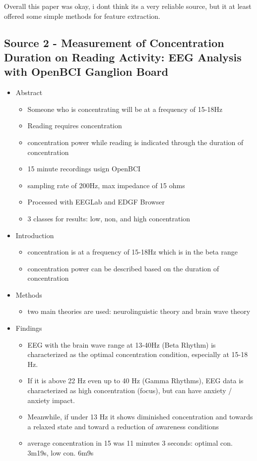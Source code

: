 \documentclass[a4paper]{article}
\begin{document}
Overall this paper was okay, i dont think its a very reliable source, but it at least offered some simple methods for feature extraction.

\subsection*{Source 2 - Measurement of Concentration Duration on Reading Activity: EEG Analysis with OpenBCI Ganglion Board}

\begin{itemize}
    \item Abstract
          \begin{itemize}
              \item Someone who is concentrating will be at a frequency of 15-18Hz
              \item Reading requires concentration
              \item concentration power while reading is indicated through the duration of concentration
              \item 15 minute recordings usign OpenBCI
              \item sampling rate of 200Hz, max impedance of 15 ohms
              \item Processed with EEGLab and EDGF Browser
              \item 3 classes for results: low, non, and high concentration
          \end{itemize}
    \item Introduction
          \begin{itemize}
              \item concentration is at a frequency of 15-18Hz which is in the beta range
              \item concentration power can be described based on the duration of concentration
          \end{itemize}
    \item Methods
          \begin{itemize}
              \item two main theories are used: neurolinguistic theory and brain wave theory
          \end{itemize}
    \item Findings
          \begin{itemize}
              \item EEG with the brain wave range at 13-40Hz (Beta Rhythm) is characterized as the optimal concentration condition, especially at 15-18 Hz.
              \item If it is above 22 Hz even up to 40 Hz (Gamma Rhythms), EEG data is characterized as high concentration (focus), but can have anxiety / anxiety impact.
              \item Meanwhile, if under 13 Hz it shows diminished concentration and towards a relaxed state and toward a reduction of awareness conditions
              \item average concentration in 15 was 11 minutes 3 seconds: optimal con. 3m19s, low con. 6m9s
          \end{itemize}
\end{itemize}
\end{document}
